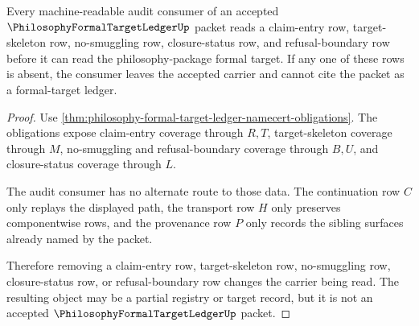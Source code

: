 \begin{theorem}
\label{thm:philosophy-formal-target-ledger-nonescape}
Every machine-readable audit consumer of an accepted $\PhilosophyFormalTargetLedgerUp$ packet reads a claim-entry row, target-skeleton row, no-smuggling row, closure-status row, and refusal-boundary row before it can read the philosophy-package formal target. If any one of these rows is absent, the consumer leaves the accepted carrier and cannot cite the packet as a formal-target ledger.
\end{theorem}
\begin{proof}
Use \autoref{thm:philosophy-formal-target-ledger-namecert-obligations}. The obligations expose claim-entry coverage through $R,T$, target-skeleton coverage through $M$, no-smuggling and refusal-boundary coverage through $B,U$, and closure-status coverage through $L$.

The audit consumer has no alternate route to those data. The continuation row $C$ only replays the displayed path, the transport row $H$ only preserves componentwise rows, and the provenance row $P$ only records the sibling surfaces already named by the packet.

Therefore removing a claim-entry row, target-skeleton row, no-smuggling row, closure-status row, or refusal-boundary row changes the carrier being read. The resulting object may be a partial registry or target record, but it is not an accepted $\PhilosophyFormalTargetLedgerUp$ packet.
\end{proof}

